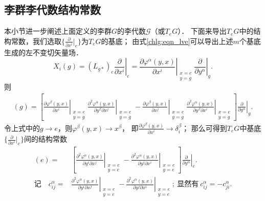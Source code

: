 

\subsection{李群李代数结构常数}\label{chlg:sec_structure-constants}
本小节进一步阐述上面定义的李群$G$的李代数$\mathscr{G}$（或$T_eG$）．
下面来导出$T_eG$中的结构常数，我们选取$\{\frac{\partial}{\partial x^i}|_{e}\}$为$T_eG$的基底；
由式\eqref{chlg:eqn_lve}可以导出上述$m$个基底生成的左不变切矢量场．
\begin{equation}
    X_i(g)=(L_{g*})_e \left.\frac{\partial }{\partial x^i}\right|_e 
    = \left. \frac{\partial \varphi^\alpha (y,x)}{\partial x^i} 
    \right|_{\substack{x=e\\y=g}}  \left. \frac{\partial}{\partial y^\alpha}\right|_{g} .
\end{equation}
则
\setlength{\mathindent}{0em}
\begin{align*}
    [X_i, X_j](g)= \left[ \left. \frac{\partial \varphi^\beta (y,x)}{\partial x^i} \right| _{\substack{x=e\\y=g}}
    \left. \frac{\partial^2 \varphi^\alpha (y,x)}{\partial y^\beta \partial x^j} \right|_{\substack{x=e\\y=g}} 
    -\left. \frac{\partial \varphi^\beta (y,x)}{\partial x^j} \right| _{\substack{x=e\\y=g}}
    \left. \frac{\partial^2 \varphi^\alpha (y,x)}{\partial y^\beta \partial x^i} \right|_{\substack{x=e\\y=g}} 
    \right] \left. \frac{\partial}{\partial y^\alpha}\right|_{g} .
\end{align*}\setlength{\mathindent}{2em}
令上式中的$g\to e$，则$\varphi^\beta(y,x) \to x^\beta$，
即$\frac{\partial \varphi^\beta (y,x)}{\partial x^i}\to \delta^\beta_i$；
那么可得到$T_eG$中基底$\{\frac{\partial}{\partial x^i}|_{e}\}$间的结构常数
\begin{align}
    [X_i, X_j](e)=& \left[ \left. \frac{\partial^2 \varphi^\alpha (y,x)}{\partial y^i \partial x^j} \right|_{\substack{x=e\\y=e}} 
    -\left. \frac{\partial^2 \varphi^\alpha (y,x)}{\partial y^j \partial x^i} \right|_{\substack{x=e\\y=e}} 
    \right] \left. \frac{\partial}{\partial y^\alpha}\right|_{e} . \\
    \text{记}\quad 
    c^\alpha_{ij}=&\left. \frac{\partial^2 \varphi^\alpha (y,x)}{\partial y^i \partial x^j} \right|_{\substack{x=e\\y=e}} -\left. 
    \frac{\partial^2 \varphi^\alpha (y,x)}{\partial y^j \partial x^i} \right|_{\substack{x=e\\y=e}};
    \ \text{显然有}\  c^\alpha_{ij} = -c^\alpha_{ji} .\label{chlg:eqn_struc-const}
\end{align}


